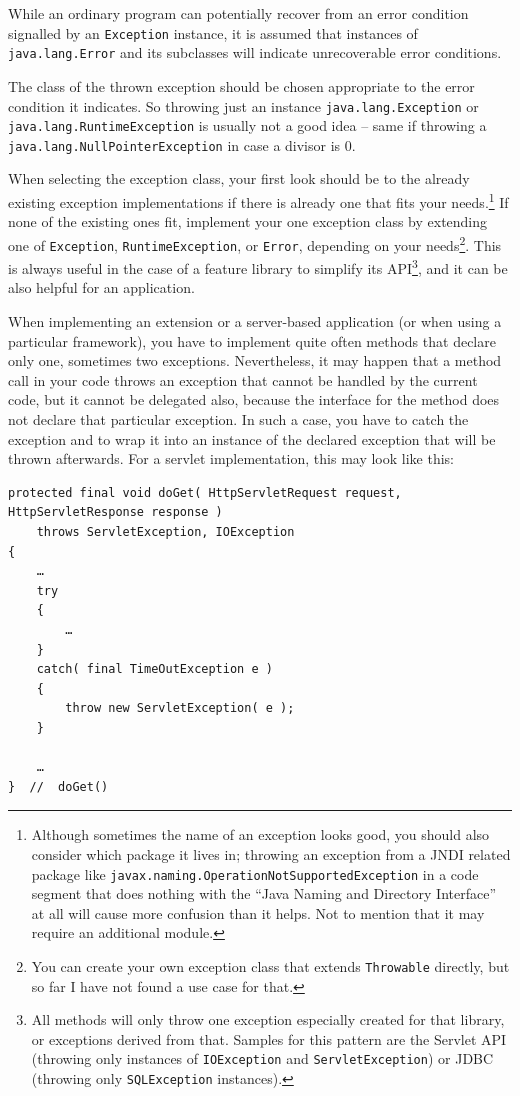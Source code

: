 \documentclass[11pt,a4paper, titlepage, parskip=half, headsepline, footsepline, cleardoublepage=current, headheight=1cm]{scrbook}
\begin{document}
While an ordinary program can potentially recover from an error condition signalled by an \lstinline|Exception| instance, it is assumed that instances of \lstinline|java.lang.Error| and its subclasses will indicate unrecoverable error conditions.

The class of the thrown exception should be chosen appropriate to the error condition it indicates. So throwing just an instance  \lstinline|java.lang.Exception| or \lstinline|java.lang.RuntimeException| is usually not a good idea – same if throwing a \lstinline|java.lang.NullPointerException| in case a divisor is 0.

When selecting the exception class, your first look should be to the already existing exception implementations if there is already one that fits your needs.\footnote{Although sometimes the name of an exception looks good, you should also consider which package it lives in; throwing an exception from a JNDI related package like \lstinline|javax.naming.OperationNotSupportedException| in a code segment that does nothing with the “Java Naming and Directory Interface” at all will cause more confusion than it helps. Not to mention that it may require an additional module.} If none of the existing ones fit, implement your one exception class by extending one of \lstinline|Exception|, \lstinline|RuntimeException|, or \lstinline|Error|, depending on your needs\footnote{You can create your own exception class that extends \lstinline|Throwable| directly, but so far I have not found a use case for that.}. This is always useful in the case of a feature library to simplify its API\footnote{All methods will only throw one exception especially created for that library, or exceptions derived from that. Samples for this pattern are the Servlet API (throwing only instances of \lstinline|IOException| and \lstinline|ServletException|) or JDBC (throwing only \lstinline|SQLException| instances).}, and it can be also helpful for an application.

When implementing an extension or a server-based application (or when using a particular framework), you have to implement quite often methods that declare only one, sometimes two exceptions. Nevertheless, it may happen that a method call in your code throws an exception that cannot be handled by the current code, but it cannot be delegated also, because the interface for the method does not declare that particular exception. In such a case, you have to catch the exception and to wrap it into an instance of the declared exception that will be thrown afterwards. For a servlet implementation\autocite{JAKARTA_EE_HTTPSERVLET_CLASS}, this may look like this:
\begin{lstlisting}
protected final void doGet( HttpServletRequest request, HttpServletResponse response )
    throws ServletException, IOException
{
    …
    try
    {
        …
    }
    catch( final TimeOutException e )
    {
        throw new ServletException( e );
    }

    …
}  //  doGet()
\end{lstlisting}
\end{document}
